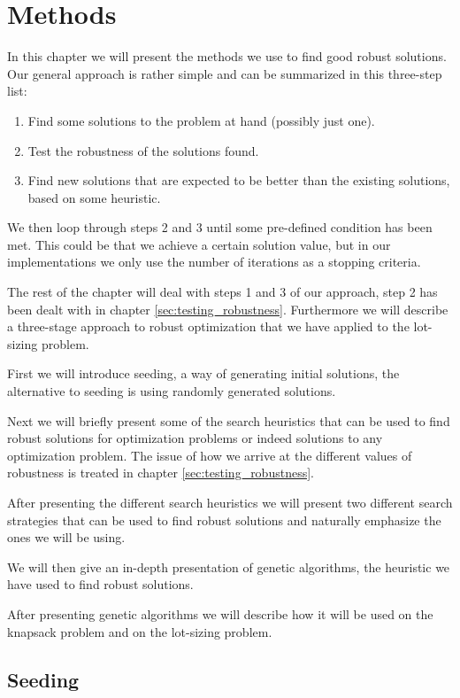 \chapter{Methods}
\label{sec:methods}

In this chapter we will present the methods we use to find good robust
solutions. Our general approach is rather simple and can be summarized
in this three-step list:
\begin{enumerate}
\item Find some solutions to the problem at hand (possibly just one).
\item Test the robustness of the solutions found.
\item Find new solutions that are expected to be better than the
  existing solutions, based on some heuristic.
\end{enumerate}

We then loop through steps 2 and 3 until some pre-defined condition
has been met. This could be that we achieve a certain solution
value, but in our implementations we only use the number of iterations as
a stopping criteria.

The rest of the chapter will deal with steps 1 and 3 of
our approach, step 2 has been dealt with in chapter
\ref{sec:testing_robustness}. Furthermore we will describe a
three-stage approach to robust optimization that we have applied to
the lot-sizing problem.

First we will introduce seeding, a way of generating initial
solutions, the alternative to seeding is using randomly generated
solutions.

Next we will briefly present some of the search heuristics
that can be used to find robust solutions for optimization
problems or indeed solutions to any optimization problem. The issue of
how we arrive at the different values of robustness is treated in
chapter \ref{sec:testing_robustness}.

After presenting the different search heuristics we will present two
different search strategies that can be used to find robust solutions
and naturally emphasize the ones we will be using.

We will then give an in-depth presentation of genetic algorithms, the
heuristic we have used to find robust solutions.

After presenting genetic algorithms we will describe how it will be
used on the knapsack problem and on the lot-sizing problem.

\section{Seeding}
\label{sec:scenario_sampling}

